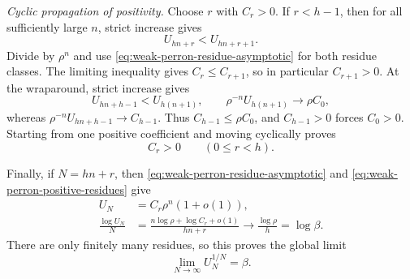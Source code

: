   \emph{Cyclic propagation of positivity.}
  Choose \(r\) with \(C_r>0\). If \(r<h-1\), then for all sufficiently
  large \(n\), strict increase gives
  \[
    U_{hn+r}<U_{hn+r+1}.
  \]
  Divide by \(\rho^n\) and use
  \eqref{eq:weak-perron-residue-asymptotic} for both residue classes. The
  limiting inequality gives \(C_r\le C_{r+1}\), so in particular
  \(C_{r+1}>0\). At the wraparound, strict increase gives
  \begin{equation}
    U_{hn+h-1}<U_{h(n+1)},
    \qquad
    \rho^{-n}U_{h(n+1)}\longrightarrow\rho C_0,
    \label{eq:weak-perron-wraparound-limit}
  \end{equation}
  whereas \(\rho^{-n}U_{hn+h-1}\to C_{h-1}\). Thus
  \(C_{h-1}\le\rho C_0\), and \(C_{h-1}>0\) forces \(C_0>0\).
  Starting from one positive coefficient and moving cyclically proves
  \begin{equation}
    C_r>0\qquad(0\le r<h).
    \label{eq:weak-perron-positive-residues}
  \end{equation}

  Finally, if \(N=hn+r\), then
  \eqref{eq:weak-perron-residue-asymptotic} and
  \eqref{eq:weak-perron-positive-residues} give
  \begin{align*}
    U_N&=C_r\rho^n(1+o(1)),\\
    \frac{\log U_N}{N}
      &=\frac{n\log\rho+\log C_r+o(1)}{hn+r}
        \longrightarrow\frac{\log\rho}{h}=\log\beta.
  \end{align*}
  There are only finitely many residues, so this proves the global limit
  \begin{equation}
    \lim_{N\to\infty}U_N^{1/N}=\beta.
    \label{eq:weak-perron-global-root-limit}
  \end{equation}
